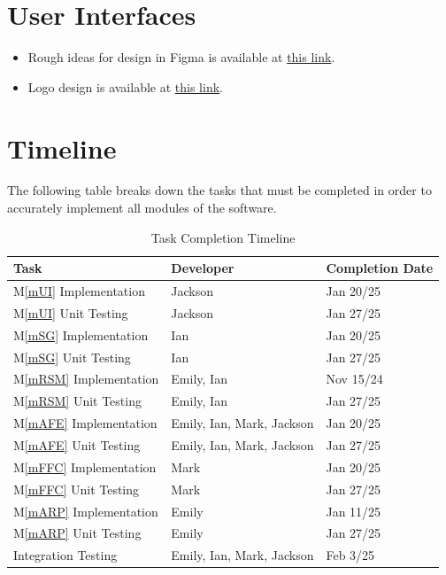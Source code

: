 \documentclass[12pt, titlepage]{article}
\newcommand{\mref}[1]{M\ref{#1}}
\begin{document}
\section{User Interfaces} \label{SecUI}
\begin{itemize}
  \item Rough ideas for design in Figma is available at \href{https://www.figma.com/design/CWFjGlXuaUj9XEe1k2O9HN/ScoreGen?node-id=8-16&t=teQzB6fJFKylFmIW-1}{this link}.
  \item Logo design is available at \href{https://www.canva.com/design/DAGb84uW3qQ/pLjQfILAEV3cagekQF9ojQ/edit?utm_content=DAGb84uW3qQ&utm_campaign=designshare&utm_medium=link2&utm_source=sharebutton}{this link}.
\end{itemize}

\section{Timeline} \label{SecTL}
The following table breaks down the tasks that must be completed in order to 
accurately implement all modules of the software.

\begin{table}[H]
  \centering
  \begin{tabular}{p{} p{} p{}}
  \toprule
  \textbf{Task} & \textbf{Developer} & \textbf{Completion Date}\\
  \midrule
  \mref{mUI} Implementation & Jackson & Jan 20/25\\
  \mref{mUI} Unit Testing & Jackson & Jan 27/25\\
  \mref{mSG} Implementation & Ian & Jan 20/25\\
  \mref{mSG} Unit Testing & Ian & Jan 27/25\\
  \mref{mRSM} Implementation & Emily, Ian & Nov 15/24\\
  \mref{mRSM} Unit Testing & Emily, Ian & Jan 27/25\\
  \mref{mAFE} Implementation & Emily, Ian, Mark, Jackson & Jan 20/25\\
  \mref{mAFE} Unit Testing & Emily, Ian, Mark, Jackson & Jan 27/25\\
  \mref{mFFC} Implementation & Mark & Jan 20/25\\
  \mref{mFFC} Unit Testing & Mark & Jan 27/25\\
  \mref{mARP} Implementation & Emily & Jan 11/25\\
  \mref{mARP} Unit Testing & Emily & Jan 27/25\\
  Integration Testing & Emily, Ian, Mark, Jackson & Feb 3/25\\
  \bottomrule
  \end{tabular}
  \caption{Task Completion Timeline}
  \label{TblSched}
  \end{table}

\newpage




\newpage{}
\end{document}
